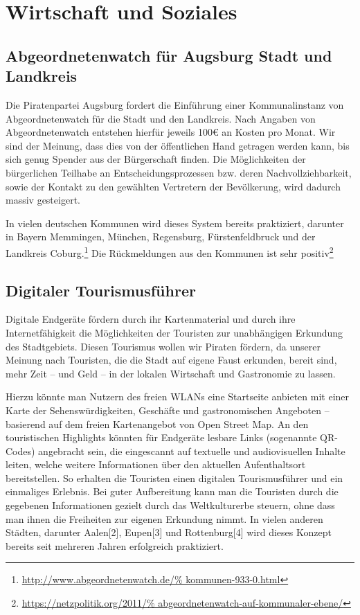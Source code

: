 \chapter{Wirtschaft und Soziales}

  \section{Abgeordnetenwatch für Augsburg Stadt und Landkreis}
  
  Die Piratenpartei Augsburg fordert die Einführung einer Kommunalinstanz von 
  Abgeordnetenwatch für die Stadt und den Landkreis. Nach Angaben von 
  Abgeordnetenwatch entstehen hierfür jeweils 100€ an Kosten pro Monat. Wir 
  sind der Meinung, dass dies von der öffentlichen Hand getragen werden kann, 
  bis sich genug Spender aus der Bürgerschaft finden. Die Möglichkeiten der 
  bürgerlichen Teilhabe an Entscheidungsprozessen bzw. deren 
  Nachvollziehbarkeit, sowie der Kontakt zu den gewählten Vertretern der 
  Bevölkerung, wird dadurch massiv gesteigert. 
  
  In vielen deutschen Kommunen wird dieses System bereits praktiziert, 
  darunter in Bayern Memmingen, München, Regensburg, Fürstenfeldbruck und der 
  Landkreis Coburg.\footnote{\url{http://www.abgeordnetenwatch.de/%
  kommunen-933-0.html}} Die Rückmeldungen aus den Kommunen ist sehr 
  positiv\footnote{\url{https://netzpolitik.org/2011/%
  abgeordnetenwatch-auf-kommunaler-ebene/}}
  
  \section{Digitaler Tourismusführer}
  
  Digitale Endgeräte fördern durch ihr Kartenmaterial und durch ihre 
  Internetfähigkeit die Möglichkeiten der Touristen zur unabhängigen Erkundung 
  des Stadtgebiets. Diesen Tourismus wollen wir Piraten fördern, da unserer 
  Meinung nach Touristen, die die Stadt auf eigene Faust erkunden, bereit 
  sind, mehr Zeit – und Geld – in der lokalen Wirtschaft und Gastronomie zu 
  lassen.
  
  Hierzu könnte man Nutzern des freien WLANs eine Startseite anbieten mit 
  einer Karte der Sehenswürdigkeiten, Geschäfte und gastronomischen Angeboten 
  – basierend auf dem freien Kartenangebot von Open Street Map. An den 
  touristischen Highlights könnten für Endgeräte lesbare Links (sogenannte 
  QR-Codes) angebracht sein, die eingescannt auf textuelle und audiovisuellen 
  Inhalte leiten, welche weitere Informationen über den aktuellen 
  Aufenthaltsort bereitstellen. So erhalten die Touristen einen digitalen 
  Tourismusführer und ein einmaliges Erlebnis. Bei guter Aufbereitung kann man 
  die Touristen durch die gegebenen Informationen gezielt durch das 
  Weltkulturerbe steuern, ohne dass man ihnen die Freiheiten zur eigenen 
  Erkundung nimmt. In vielen anderen Städten, darunter Aalen[2], Eupen[3] und 
  Rottenburg[4] wird dieses Konzept bereits seit mehreren Jahren erfolgreich 
  praktiziert.
  
